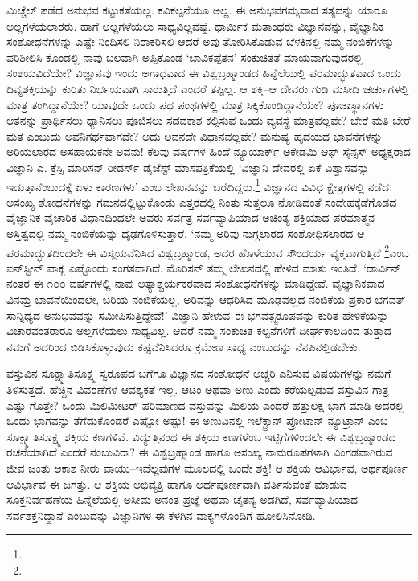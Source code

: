 ಮಿಚ್ಚೆಲ್ ಪಡೆದ ಅನುಭವ ಕಟ್ಟುಕತೆಯಲ್ಲ. ಕವಿಕಲ್ಪನೆಯೂ ಅಲ್ಲ. ಈ ಅನುಭವಗಮ್ಯವಾದ ಸತ್ಯವನ್ನು ಯಾರೂ ಅಲ್ಲಗಳೆಯಲಾರರು. ಹಾಗೆ ಅಲ್ಲಗಳೆಯಲು ಸಾಧ್ಯವಿಲ್ಲವಷ್ಟೆ. ಧಾರ್ಮಿಕ ಮತಾಂಧರು ವಿಜ್ಞಾನವನ್ನು, ವೈಜ್ಞಾನಿಕ ಸಂಶೋಧನೆಗಳನ್ನು ಎಷ್ಟೇ ನಿಂದಿಸಲಿ ನಿರಾಕರಿ\-ಸಲಿ ಆದರೆ ಅವು ತೋರಿಸಿಕೊಡುವ ಬೆಳಕಿನಲ್ಲಿ ನಮ್ಮ ನಂಬಿಕೆಗಳನ್ನು ಪರಿಶೀಲಿಸಿ ಕೊಂಡಲ್ಲಿ ನಾವು ಬಲವಾಗಿ ಅಪ್ಪಿಕೊಂಡ ‘ಬಾವಿಕಪ್ಪೆತನ’ ಸಂಕುಚಿತತೆ ಮಾಯವಾಗುವುದರಲ್ಲಿ ಸಂಶಯವಿದೆಯೇ? ವಿಜ್ಞಾನವು ಇಂದು ಅಗಾಧವಾದ ಈ ವಿಶ್ವಬ್ರಹ್ಮಾಂಡದ ಹಿನ್ನೆಲೆಯಲ್ಲಿ ಪರಮಾದ್ಭುತವಾದ ಒಂದು ದಿವ್ಯಶಕ್ತಿಯನ್ನು ಕುರಿತು ನಿರ್ಭಯವಾಗಿ ಸಾರುತ್ತಿದೆ ಎಂದರೆ ತಪ್ಪಿಲ್ಲ. ಆ ಶಕ್ತಿ–ಆ ದೇವರು ಗುಡಿ ಮಸೀದಿ ಚರ್ಚುಗಳಲ್ಲಿ ಮಾತ್ರ ತಂಗಿದ್ದಾನೆಯೇ? ಯಾವುದೇ ಒಂದು ಪಥ ಪಂಥಗಳಲ್ಲಿ ಮಾತ್ರ ಸಿಕ್ಕಿಕೊಂಡಿದ್ದಾನೆಯೇ? ಪೂಜಾಸ್ಥಾನಗಳು ಆತನನ್ನು ಪ್ರಾರ್ಥಿಸಲು ಧ್ಯಾನಿಸಲು ಪೂಜಿಸಲು ಸದವಕಾಶ ಕಲ್ಪಿಸುವ ಒಂದು ವ್ಯವಸ್ಥೆ ಮಾತ್ರವಲ್ಲವೇ? ಬೇರೆ ಮತಿ ಬೇರೆ ಮತ ಎಂಬುದು ಅವನಿಗರ್ಥವಾಗದೇ? ಅದು ಅವನದೇ ವಿಧಾನವಲ್ಲವೇ? ಮನುಷ್ಯ ಹೃದಯದ ಭಾವನೆಗಳನ್ನು ಅರಿಯಲಾರದ ಅಸಹಾಯಕನೇ ಅವನು! ಕೆಲವು ವರ್ಷಗಳ ಹಿಂದೆ ನ್ಯೂಯಾರ್ಕ್ ಅಕೇಡಮಿ ಆಫ್ ಸೈನ್ಸಸ್ ಅಧ್ಯಕ್ಷರಾದ ವಿಜ್ಞಾನಿ ಎ. ಕ್ರೆಸ್ಸಿ ಮಾರಿಸನ್ ರೀಡರ್ಸ್ ಡೈಜೆಸ್ಟ್ ಮಾಸಪತ್ರಿಕೆಯಲ್ಲಿ ‘ವಿಜ್ಞಾನಿ ದೇವರಲ್ಲಿ ಏಕೆ ವಿಶ್ವಾಸವನ್ನು ಇಡುತ್ತಾನೆಂಬುದಕ್ಕೆ ಏಳು ಕಾರಣಗಳು’ ಎಂಬ ಲೇಖನವನ್ನು ಬರೆದಿದ್ದರು.\footnote{} ವಿಜ್ಞಾನದ ವಿವಿಧ ಕ್ಷೇತ್ರಗಳಲ್ಲಿ ನಡೆದ ಅಸಂಖ್ಯ ಶೋಧನೆಗಳನ್ನು ಗಮನದಲ್ಲಿಟ್ಟುಕೊಂಡು ಎತ್ತರದಲ್ಲಿ ನಿಂತು ಸುತ್ತಲೂ ನೋಡಿದಂತೆ ಸಂದೇಹಕ್ಕೆಡೆಗೊಡದ ವೈಜ್ಞಾನಿಕ ವೈಚಾರಿಕ ವಿಧಾನದಿಂದಲೇ ಅವರು ಸರ್ವತ್ರ ಸರ್ವವ್ಯಾಪಿಯಾದ ಅಚಿಂತ್ಯ ಶಕ್ತಿಯಾದ ಪರಮಾತ್ಮನ ಅಸ್ತಿತ್ವದಲ್ಲಿ ನಮ್ಮ ನಂಬಿಕೆಯನ್ನು ದೃಢಗೊಳಿಸುತ್ತಾರೆ. ‘ನಮ್ಮ ಅರಿವು ನುಗ್ಗಲಾರದ ಸಂಶೋಧಿಸಲಾರದ ಆ ಪರಮಾದ್ಭುತದಿಂದಲೇ ಈ ವಿಸ್ಮಯವೆನಿಸಿದ ವಿಶ್ವಬ್ರಹ್ಮಾಂಡ, ಅದರ ಹೊಳೆಯುವ ಸೌಂದರ್ಯ ವ್ಯಕ್ತವಾಗುತ್ತಿದೆ \footnote{}ಎಂಬ ಐನ್​ಸ್ಟೀನ್ ವಾಕ್ಯ ಎಷ್ಟೊಂದು ಸಂಗತವಾಗಿದೆ. ಮೊರಿಸನ್ ತಮ್ಮ ಲೇಖನದಲ್ಲಿ ಹೇಳಿದ ಮಾತು ಇಂತಿದೆ. ‘ಡಾರ್ವಿನ್ ನಂತರ ಈ ೧೦೦ ವರ್ಷಗಳಲ್ಲಿ ನಾವು ಅತ್ಯಾಶ್ಚರ್ಯಕರವಾದ ಸಂಶೋಧನೆಗಳನ್ನು ಮಾಡಿದ್ದೇವೆ. ವೈಜ್ಞಾನಿಕವಾದ ವಿನಮ್ರ ಭಾವನೆಯಿಂದಲೇ, ಬರಿಯ ನಂಬಿಕೆಯಲ್ಲ, ಅರಿವನ್ನು ಆಧರಿಸಿದ ಮೂಢವಲ್ಲದ ನಂಬಿಕೆಯ ಪ್ರಕಾರ ಭಗವತ್ ಸಾನ್ನಿಧ್ಯದ ಅನುಭವವನ್ನು ಸಮೀಪಿಸುತ್ತಿದ್ದೇವೆ!’ ವಿಜ್ಞಾನಿ ಹೇಳುವ ಈ ಭಗವತ್ಸ್ವರೂಪವನ್ನು ಕುರಿತ ಹೇಳಿಕೆಯನ್ನು ವಿಚಾರವಂತರಾರೂ ಅಲ್ಲಗಳೆಯಲು ಸಾಧ್ಯವಿಲ್ಲ. ಆದರೆ ನಮ್ಮ ಸಂಕುಚಿತ ಕಲ್ಪನೆಗಳಿಗೆ ದೀರ್ಘಕಾಲದಿಂದ ತುತ್ತಾದ ನಮಗೆ ಅದರಿಂದ ಬಿಡಿಸಿ\-ಕೊಳ್ಳುವುದು ಕಷ್ಟವೆನಿಸಿದರೂ ಕ್ರಮೇಣ ಸಾಧ್ಯ ಎಂಬುದನ್ನು ನೆನಪಿನಲ್ಲಿಡಬೇಕು.

ವಸ್ತುವಿನ ಸೂಕ್ಷ್ಮಾತಿಸೂಕ್ಷ್ಮ ಸ್ವರೂಪದ ಬಗೆಗೂ ವಿಜ್ಞಾನದ ಸಂಶೋಧನೆ ಅಚ್ಚರಿ ಎನಿಸುವ ವಿಷಯಗಳನ್ನು ನಮಗೆ ತಿಳಿಸುತ್ತದೆ. ಹೆಚ್ಚಿನ ವಿವರಣೆಗಳ ಆವಶ್ಯಕತೆ ಇಲ್ಲ. ಆಟಂ ಅಥವಾ ಅಣು ಎಂದು ಕರೆಯಲ್ಪಡುವ ವಸ್ತುವಿನ ಗಾತ್ರ ಎಷ್ಟು ಗೊತ್ತೇ? ಒಂದು ಮಿಲಿಮೀಟರ್ ಪರಿಮಾಣದ ವಸ್ತುವನ್ನು ಮಿಲಿಯ ಎಂದರೆ ಹತ್ತುಲಕ್ಷ ಭಾಗ ಮಾಡಿ ಅದರಲ್ಲಿ ಒಂದು ಭಾಗವನ್ನು ತೆಗೆದುಕೊಂಡರೆ ಎಷ್ಟೋ ಅಷ್ಟು! ಈ ಅಣುವಿನಲ್ಲಿ ಇಲೆಕ್ಟ್ರಾನ್ ಪ್ರೋಟಾನ್ ನ್ಯೂಟ್ರಾನ್ ಎಂಬ ಸೂಕ್ಷ್ಮಾತಿಸೂಕ್ಷ್ಮ ಶಕ್ತಿಯ ಕಣಗಳಿವೆ. ವಿದ್ಯುತ್ತಿನಂಥ ಈ ಶಕ್ತಿಯ ಕಣಗಳೆಂಬ ಇಟ್ಟಿಗೆಗಳಿಂದಲೇ ಈ ವಿಶ್ವಬ್ರಹ್ಮಾಂಡದ ರಚನೆಯಾಗಿದೆ ಎಂದರೆ ನಂಬುವಿರಾ? ಈ ವಿಶ್ವಬ್ರಹ್ಮಾಂಡ ಹಾಗೂ ಅಸಂಖ್ಯ ನಾಮರೂಪಗಳಾಗಿ ವಿಂಗಡವಾಗಿರುವ ಜೀವ ಜಂತು ಆಕಾಶ ನೀರು ವಾಯು–ಇವೆಲ್ಲವುಗಳ ಮೂಲದಲ್ಲಿ ಒಂದೇ ಶಕ್ತಿ! ಆ ಶಕ್ತಿಯ ಆವಿರ್ಭಾವ, ಅರ್ಥಪೂರ್ಣ ಆವಿರ್ಭಾವ ಈ ಜಗತ್ತು. ಆ ಶಕ್ತಿಯ ಅಭಿವ್ಯಕ್ತಿ ಹಾಗೂ ಅರ್ಥಪೂರ್ಣವಾಗಿ ವರ್ತಿಸುವಂತೆ ಮಾಡುವ ಸೂಕ್ತನಿರ್ವಹಣೆಯ ಹಿನ್ನೆಲೆಯಲ್ಲಿ ಅಸೀಮ ಅನಂತ ಪ್ರಜ್ಞೆ ಅಥವಾ ಚೈತನ್ಯ ಅಡಗಿದೆ, ಸರ್ವವ್ಯಾಪಿಯಾದ ಸರ್ವ\-ಶಕ್ತನಿದ್ದಾನೆ ಎಂಬುದನ್ನು ವಿಜ್ಞಾನಿಗಳ ಈ ಕೆಳಗಿನ ವಾಕ್ಯಗಳೊಂದಿಗೆ ಹೋಲಿಸಿನೋಡಿ.

